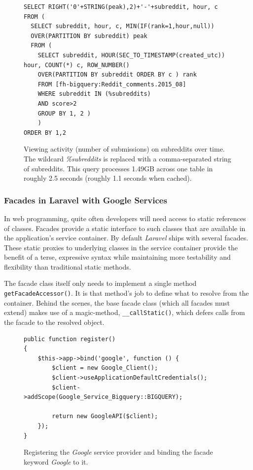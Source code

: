 \documentclass[msc,oneside]{ubcthesis}%
\begin{document}
\begin{figure}[H]
\begin{lstlisting}
SELECT RIGHT('0'+STRING(peak),2)+'-'+subreddit, hour, c 
FROM (
  SELECT subreddit, hour, c, MIN(IF(rank=1,hour,null)) 
  OVER(PARTITION BY subreddit) peak 
  FROM (
    SELECT subreddit, HOUR(SEC_TO_TIMESTAMP(created_utc)) hour, COUNT(*) c, ROW_NUMBER() 
    OVER(PARTITION BY subreddit ORDER BY c ) rank 
    FROM [fh-bigquery:Reddit_comments.2015_08] 
    WHERE subreddit IN (%subreddits) 
    AND score>2 
    GROUP BY 1, 2 )
    )
ORDER BY 1,2
\end{lstlisting}
\caption[Query finding the best hours to post on \textit{Reddit}]{
Viewing activity (number of submissions) on subreddits over time. The wildcard \textit{\%subreddits} is replaced with a comma-separated string of subreddits. This query processes 1.49GB across one table in roughly 2.5 seconds (roughly 1.1 seconds when cached).}
\end{figure}

\subsubsection{Facades in Laravel with Google Services}
In web programming, quite often developers will need access to static references of classes. Facades provide a static interface to such classes that are available in the application's service container. By default \textit{Laravel} ships with several facades. These static proxies to underlying classes in the service container provide the benefit of a terse, expressive syntax while maintaining more testability and flexibility than traditional static methods.
\par
The facade class itself only needs to implement a single method \texttt{getFacadeAccessor()}. It is that method's job to define what to resolve from the container. Behind the scenes, the base facade class (which all facades must extend) makes use of a magic-method, \texttt{\_\_callStatic()}, which defers calls from the facade to the resolved object. 

\begin{figure}[H]
\begin{lstlisting}
public function register()
{
	$this->app->bind('google', function () {
		$client = new Google_Client();
		$client->useApplicationDefaultCredentials();
		$client->addScope(Google_Service_Bigquery::BIGQUERY);
		
		return new GoogleAPI($client);
	});
}
\end{lstlisting}
\caption[Registering the Google service provider]{
Registering the \textit{Google} service provider and binding the facade keyword \textit{Google} to it.}
\end{figure}
\end{document}
